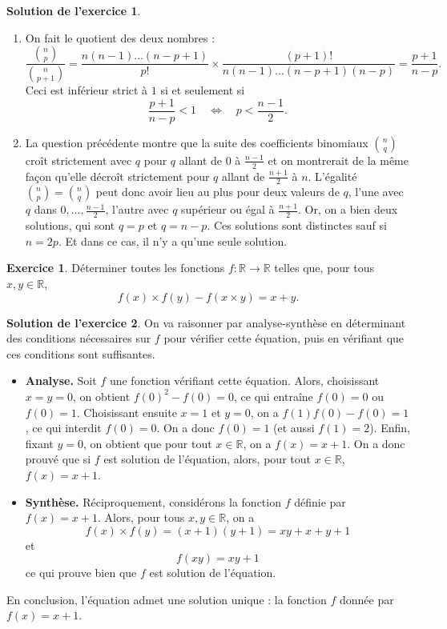 \documentclass[a4paper, 11pt,openany]{article}%
\theoremstyle{plain}
\theoremstyle{definition}
\newtheorem{exo}{Exercice}
\newtheorem{sol}{Solution de l'exercice}
\theoremstyle{remark}
\newcommand{\R}{\mathbb{R}}
\begin{document}
\begin{sol}
\begin{enumerate}
\item On fait le quotient des deux nombres :
\[ \frac{\binom{n}{p}}{\binom{n}{p+1}} = \frac{n(n-1) ... (n-p+1)}{p!} \times \frac{(p+1)!}{n(n-1) ... (n-p+1)(n-p)} = \frac{p+1}{n-p}.\]
Ceci est inférieur strict à $1$ si et seulement si
\[ \frac{p+1}{n-p} < 1 \quad \Leftrightarrow \quad p< \frac{n-1}{2}.\]
\item La question précédente montre que la suite des coefficients binomiaux $\binom{n}{q}$
croît strictement avec $q$ pour $q$ allant de $0$ à $\frac{n-1}{2}$ et on montrerait de la même façon qu'elle décroît strictement pour $q$ allant de $\frac{n+1}{2}$ à $n$. L'égalité $\binom{n}{p} = \binom{n}{q}$ peut donc avoir lieu au plus pour deux valeurs de $q$, l'une avec $q$ dans $0,...,\frac{n-1}{2}$, l'autre avec $q$ supérieur ou égal à $\frac{n+1}{2}$. Or, on a bien deux solutions, qui sont $q=p$ et $q=n-p$. Ces solutions sont distinctes sauf si $n=2p$. Et dans ce cas, il n'y a qu'une seule solution.
\end{enumerate}
\end{sol}

\begin{exo}
Déterminer toutes les fonctions $f:\R \to \R$ telles que, pour tous $x,y \in \R$, 
\[ f(x) \times f(y) -f(x \times y)=x+y.\]
\end{exo}

   
\begin{sol}
On va raisonner par analyse-synthèse en déterminant des conditions nécessaires sur $f$ pour vérifier cette équation, puis en vérifiant que ces conditions sont suffisantes.
\begin{itemize}
\item \textbf{Analyse.} Soit $f$ une fonction vérifiant cette équation. Alors, choisissant $x=y=0$, on obtient $f(0)^2-f(0)=0$, ce qui entraîne $f(0)=0$ ou $f(0)=1$. Choisissant ensuite $x=1$ et $y=0$, on a $f(1)f(0)-f(0)=1$, ce qui interdit $f(0)=0$. On a donc $f(0)=1$ (et aussi $f(1)=2$). Enfin, fixant $y=0$, on obtient que pour tout $x\in \R$, on a $f(x)=x+1$. On a donc prouvé que si $f$ est solution de l'équation, alors, pour tout $x \in \R$, $f(x)=x+1$.
\item \textbf{Synthèse.} Réciproquement, considérons la fonction $f$ définie par $f(x)=x+1$. Alors, pour tous $x,y \in \R$, on a 
\[ f(x) \times f(y)=(x+1)(y+1)=xy+x+y+1\]
et
\[ f(xy)=xy+1\]
 ce qui prouve bien que $f$ est solution de l'équation. 
\end{itemize}
En conclusion, l'équation admet une solution unique : la fonction $f$ donnée par $f(x)=x+1$.
\end{sol}
\end{document}
